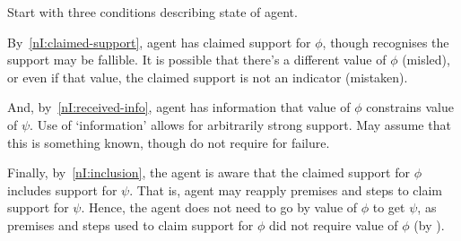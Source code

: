 \begin{note}
  Start with three conditions describing state of agent.

  By~\ref{nI:claimed-support}, agent has claimed support for \(\phi\), though recognises the support may be fallible.
  It is possible that there's a different value of \(\phi\) (misled), or even if that value, the claimed support is not an indicator (mistaken).

  And, by~\ref{nI:received-info}, agent has information that value of \(\phi\) constrains value of \(\psi\).
  Use of `information' allows for arbitrarily strong support.
  May assume that this is something known, though do not require for failure.

  Finally, by~\ref{nI:inclusion}, the agent is aware that the claimed support for \(\phi\) includes support for \(\psi\).
  That is, agent may reapply premises and steps to claim support for \(\psi\).
  Hence, the agent does not need to go by value of \(\phi\) to get \(\psi\), as premises and steps used to claim support for \(\phi\) did not require value of \(\phi\) (by \eiS{}).
\end{note}


